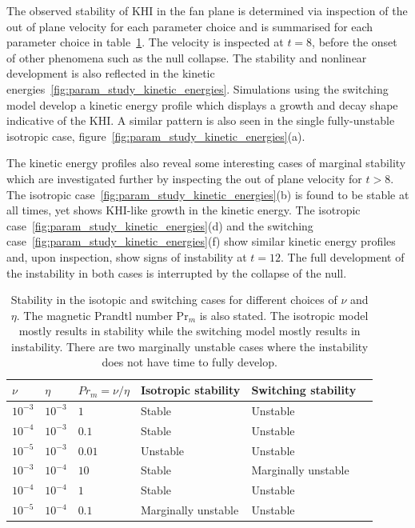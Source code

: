 The observed stability of KHI in the fan plane is determined via inspection of the out of plane velocity for each parameter choice and is summarised for each parameter choice in table~\ref{tab:stability}. The velocity is inspected at $t=8$, before the onset of other phenomena such as the null collapse. The stability and nonlinear development is also reflected in the kinetic energies~\ref{fig:param_study_kinetic_energies}. Simulations using the switching model develop a kinetic energy profile which displays a growth and decay shape indicative of the KHI. A similar pattern is also seen in the single fully-unstable isotropic case, figure~\ref{fig:param_study_kinetic_energies}(a).

The kinetic energy profiles also reveal some interesting cases of marginal stability which are investigated further by inspecting the out of plane velocity for $t>8$. The isotropic case~\ref{fig:param_study_kinetic_energies}(b) is found to be stable at all times, yet shows KHI-like growth in the kinetic energy. The isotropic case~\ref{fig:param_study_kinetic_energies}(d) and the switching case~\ref{fig:param_study_kinetic_energies}(f) show similar kinetic energy profiles and, upon inspection, show signs of instability at $t=12$. The full development of the instability in both cases is interrupted by the collapse of the null.

\begin{table}[]
\centering
\begin{tabular}{llllll}
$\nu$    & $\eta$    & $Pr_m = \nu/\eta$ & Isotropic stability & Switching stability &  \\
\midrule
$10^{-3}$ & $10^{-3}$ & $1$ & Stable                 & Unstable                 &  \\
$10^{-4}$ & $10^{-3}$ & $0.1$ & Stable                 & Unstable                 &  \\
$10^{-5}$ & $10^{-3}$ & $0.01$ & Unstable                 & Unstable                 &  \\
$10^{-3}$ & $10^{-4}$ & $10$ & Stable                 & Marginally unstable                 &  \\
$10^{-4}$ & $10^{-4}$ & $1$ & Stable                 & Unstable                 &  \\
$10^{-5}$ & $10^{-4}$ & $0.1$ & Marginally unstable                 & Unstable                 & 
\end{tabular}
\caption{Stability in the isotopic and switching cases for different choices of $\nu$ and $\eta$. The magnetic Prandtl number Pr$_m$ is also stated. The isotropic model mostly results in stability while the switching model mostly results in instability. There are two marginally unstable cases where the instability does not have time to fully develop.}
\label{tab:stability}
\end{table}

